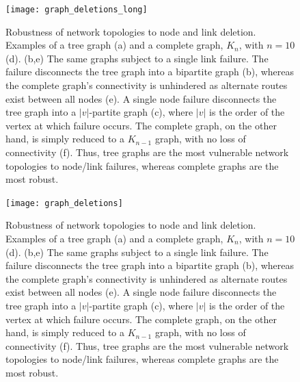 \pubmode
	\begin{figure}[!htbp]
	\texttt{[image: graph\_deletions\_long]}
	\captionspacefig \caption{Robustness of network topologies to node and link deletion. Examples of a tree graph (a) and a complete graph, $K_n$, with \mbox{$n=10$} (d). (b,e) The same graphs subject to a single link failure. The failure disconnects the tree graph into a bipartite graph (b), whereas the complete graph's connectivity is unhindered as alternate routes exist between all nodes (e). A single node failure disconnects the tree graph into a $|v|$-partite graph (c), where $|v|$ is the order of the vertex at which failure occurs. The complete graph, on the other hand, is simply reduced to a $K_{n-1}$ graph, with no loss of connectivity (f). Thus, tree graphs are the most vulnerable network topologies to node/link failures, whereas complete graphs are the most robust.}\label{fig:graph_deletions}
	\end{figure}
\else
	\begin{figure}[!htbp]
	\texttt{[image: graph\_deletions]}
	\captionspacefig \caption{Robustness of network topologies to node and link deletion. Examples of a tree graph (a) and a complete graph, $K_n$, with \mbox{$n=10$} (d). (b,e) The same graphs subject to a single link failure. The failure disconnects the tree graph into a bipartite graph (b), whereas the complete graph's connectivity is unhindered as alternate routes exist between all nodes (e). A single node failure disconnects the tree graph into a $|v|$-partite graph (c), where $|v|$ is the order of the vertex at which failure occurs. The complete graph, on the other hand, is simply reduced to a $K_{n-1}$ graph, with no loss of connectivity (f). Thus, tree graphs are the most vulnerable network topologies to node/link failures, whereas complete graphs are the most robust.}\label{fig:graph_deletions}
	\end{figure}
\fi